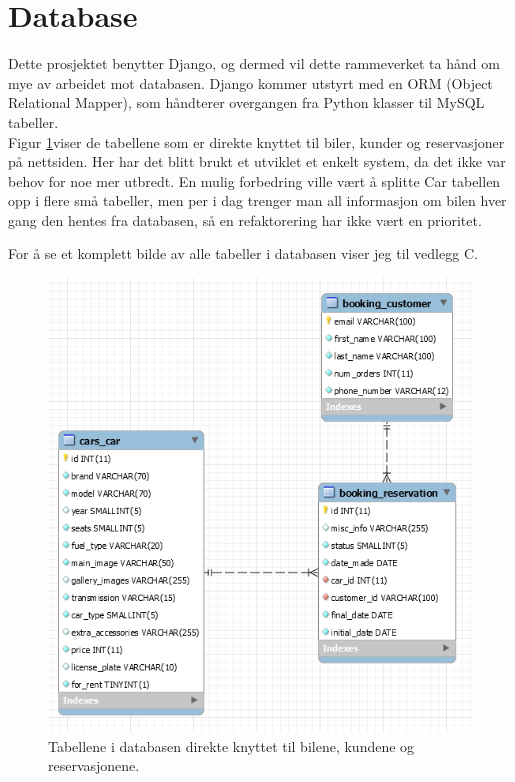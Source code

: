 \newpage


\section{Database}
Dette prosjektet benytter Django, og dermed vil dette rammeverket ta hånd om mye av arbeidet mot databasen. Django kommer utstyrt med en ORM (Object Relational Mapper), som håndterer overgangen fra Python klasser til MySQL tabeller. \\
 
Figur \ref{fig:tables}viser de tabellene som er direkte knyttet til biler, kunder og reservasjoner på nettsiden. Her har det blitt brukt et utviklet et enkelt system, da det ikke var behov for noe mer utbredt. En mulig forbedring ville vært å splitte Car tabellen opp i flere små tabeller, men per i dag trenger man all informasjon om bilen hver gang den hentes fra databasen, så en refaktorering har ikke vært en prioritet. 

For å se et komplett bilde av alle tabeller i databasen viser jeg til vedlegg C.

 \begin{figure}[htbp]
	\centering
		\includegraphics[scale=0.7]{Bilder/db01.png}
	\caption[Tabellene i Database]{Tabellene i databasen direkte knyttet til bilene, kundene og reservasjonene. } %
	\label{fig:tables}
\end{figure}



